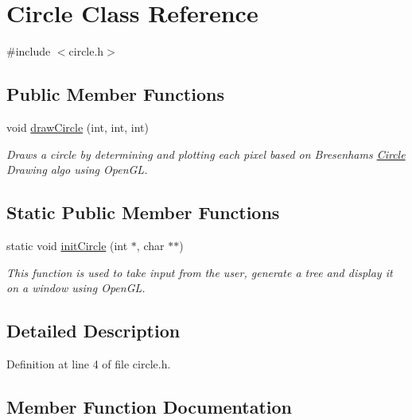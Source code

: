 \hypertarget{class_circle}{}\section{Circle Class Reference}
\label{class_circle}


{\ttfamily \#include $<$circle.\+h$>$}

\subsection*{Public Member Functions}
\begin{DoxyCompactItemize}
\item 
void \mbox{\hyperlink{class_circle_aede1245d2b92f9d042878133274822cd}{draw\+Circle}} (int, int, int)
\begin{DoxyCompactList}\small\item\em Draws a circle by determining and plotting each pixel based on Bresenham\textquotesingle{}s \mbox{\hyperlink{class_circle}{Circle}} Drawing algo using Open\+GL. \end{DoxyCompactList}\end{DoxyCompactItemize}
\subsection*{Static Public Member Functions}
\begin{DoxyCompactItemize}
\item 
static void \mbox{\hyperlink{class_circle_afe00ea9113248e8f470cfbe5f227d986}{init\+Circle}} (int $\ast$, char $\ast$$\ast$)
\begin{DoxyCompactList}\small\item\em This function is used to take input from the user, generate a tree and display it on a window using Open\+GL. \end{DoxyCompactList}\end{DoxyCompactItemize}


\subsection{Detailed Description}


Definition at line 4 of file circle.\+h.



\subsection{Member Function Documentation}
\mbox{\label{class_circle_aede1245d2b92f9d042878133274822cd}} 
